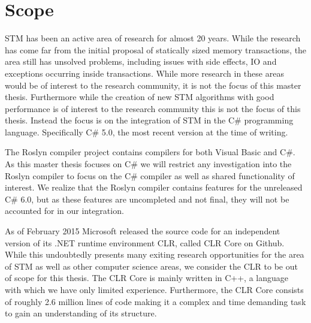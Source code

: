 \section{Scope}\label{sec:scope}
\ac{STM} has been an active area of research for almost 20 years\cite{shavit1997software}. While the research has come far from the initial proposal of statically sized memory transactions, the area still has unsolved problems, including issues with side effects, \ac{IO} and exceptions occurring inside transactions\cite{harris2005exceptions}. While more research in these areas would be of interest to the research community, it is not the focus of this master thesis. Furthermore while the creation of new \ac{STM} algorithms with good performance is of interest to the research community this is not the focus of this thesis. Instead the focus is on the integration of \ac{STM} in the C\# programming language. Specifically C\# 5.0, the most recent version at the time of writing\cite{csharp2013specificaiton}.


The Roslyn compiler project contains compilers for both Visual Basic and C\#\cite{roslyn}. As this master thesis focuses on C\# we will restrict any investigation into the Roslyn compiler to focus on the C\# compiler as well as shared functionality of interest. We realize that the Roslyn compiler contains features for the unreleased C\# 6.0, but as these features are uncompleted and not final, they will not be accounted for in our integration.

As of February 2015 Microsoft released the source code for an independent version of its .NET runtime environment \acl{CLR}, called \ac{CLR} Core on Github\cite{coreclr}. While this undoubtedly presents many exiting research opportunities for the area of \ac{STM} as well as other computer science areas, we consider the \ac{CLR} to be out of scope for this thesis. The \ac{CLR} Core is mainly written in C++\cite{coreclr}, a language with which we have only limited experience. Furthermore, the \ac{CLR} Core consists of roughly 2.6 million lines of code\cite{coreclrBlog} making it a complex and time demanding task to gain an understanding of its structure.

